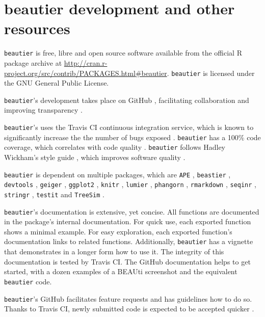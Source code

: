 \documentclass{article}
\begin{document}
\section{beautier development and other resources}

\verb;beautier; is free, libre and open source software available from the official R package archive at 
\url{http://cran.r-project.org/src/contrib/PACKAGES.html\#beautier}.  
\verb;beautier; is licensed under the GNU General Public License.

\verb;beautier;'s development takes place on GitHub \cite{github}, 
facilitating collaboration \cite{perez2016ten} 
and improving transparency \cite{gorgolewski2016practical}.

\verb;beautier;'s uses the Travis CI \cite{travis} 
continuous integration service, which is known to significantly 
increase the the number of bugs exposed \cite{vasilescu2015}.
\verb;beautier; has a 100\% code coverage, which correlates with code quality \cite{horgan1994,del1995correlation}. 
\verb;beautier; follows Hadley Wickham's style guide \cite{style_guide}, which improves software quality \cite{fang2001}.

\verb;beautier; is dependent on multiple packages, which are 
\verb;APE; \cite{APE}, 
\verb;beastier; \cite{beastier},
\verb;devtools; \cite{devtools},
\verb;geiger; \cite{GEIGER},
\verb;ggplot2; \cite{ggplot2},
\verb;knitr; \cite{knitr},
\verb;lumier; \cite{lumier},
\verb;phangorn; \cite{phangorn},
\verb;rmarkdown; \cite{rmarkdown},
\verb;seqinr; \cite{seqinr},
\verb;stringr; \cite{stringr},
\verb;testit; \cite{testit} and 
\verb;TreeSim; \cite{TreeSim}.

\verb;beautier;'s documentation is extensive, yet concise. All functions are documented
in the package's internal documentation. For quick use, each exported function shows a minimal example. 
For easy exploration, each exported function's documentation links to related functions.
Additionally, \verb;beautier; has a vignette that demonstrates in a longer form how
to use it. The integrity of this documentation is tested by Travis CI.
The GitHub documentation helps to get started, with a dozen examples 
of a BEAUti screenshot and the equivalent \verb;beautier; code.

\verb;beautier;'s GitHub facilitates feature requests and has guidelines how to do so.
Thanks to Travis CI, newly submitted code is expected to be accepted quicker \cite{vasilescu2015}.
\end{document}
